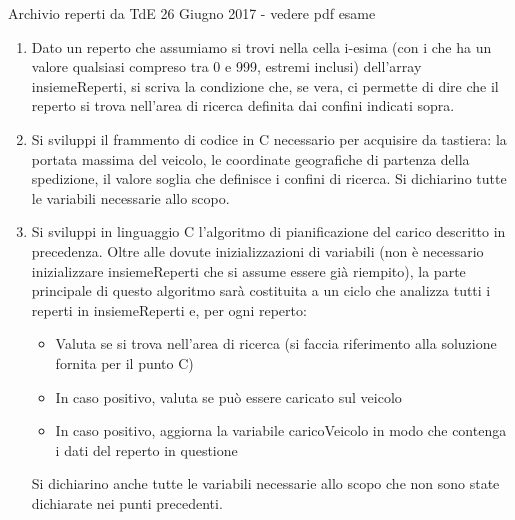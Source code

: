 \documentclass[format=169]{beamer}
\begin{document}
\begin{frame}[allowframebreaks]{Archivio reperti da TdE 26 Giugno 2017 - vedere pdf esame}
\begin{enumerate}
Si parte con un veicolo scarico, di portata pMax, da una coppia di coordinate geografiche (latitudineI
e longitudineI) e si esplorano le vicinanze di quelle coordinate geografiche in modo da rimanere
nell’ambito della zona di ricerca, i cui confini sono definiti dai punti latitudineI ± soglia,
longitudineI ± soglia. Per ogni reperto che si trova nei confini definiti, si pianifica di caricare il
reperto a bordo del veicolo, a patto che il suo peso, sommato al peso del carico corrente portato dal veicolo,
sia minore di pMax. In caso contrario, quel reperto viene scartato e si procede a cercarne un altro, sempre
rimanendo nei confini dell’area di ricerca. La ricerca termina quando il peso dei reperti da trasportare avrà
raggiunto il valore pMax oppure quando tutti i reperti nella zona di ricerca saranno stati esaminati.

L’algoritmo di pianificazione del viaggio, durante l’analisi sopra descritta, crea un array di reperti chiamato
caricoVeicolo che contiene, alla fine dell’analisi, tutti i reperti che dovranno essere caricati sul veicolo
durante l’esecuzione della spedizione.

\item Dato un reperto che assumiamo si trovi nella cella i-esima (con i che ha un valore qualsiasi compreso tra
0 e 999, estremi inclusi) dell’array insiemeReperti, si scriva la condizione che, se vera, ci permette di
dire che il reperto si trova nell’area di ricerca definita dai confini indicati sopra.

\item Si sviluppi il frammento di codice in C necessario per acquisire da tastiera: la portata massima del
veicolo, le coordinate geografiche di partenza della spedizione, il valore soglia che definisce i confini di
ricerca. Si dichiarino tutte le variabili necessarie allo scopo.

\item Si sviluppi in linguaggio C l’algoritmo di pianificazione del carico descritto in precedenza. Oltre alle
dovute inizializzazioni di variabili (non è necessario inizializzare insiemeReperti che si assume essere
già riempito), la parte principale di questo algoritmo sarà costituita a un ciclo che analizza tutti i reperti in
insiemeReperti e, per ogni reperto:
\begin{itemize}
\item  Valuta se si trova nell’area di ricerca (si faccia riferimento alla soluzione fornita per il punto C)
\item  In caso positivo, valuta se può essere caricato sul veicolo
\item  In caso positivo, aggiorna la variabile caricoVeicolo in modo che contenga i dati del reperto in
questione
\end{itemize}
Si dichiarino anche tutte le variabili necessarie allo scopo che non sono state dichiarate nei punti precedenti.
\end{enumerate}

\end{frame}
\end{document}
